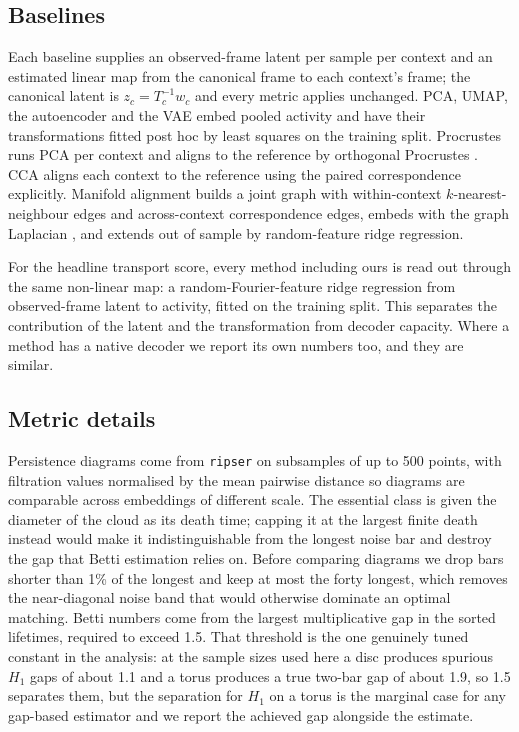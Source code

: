 \subsection{Baselines}

Each baseline supplies an observed-frame latent per sample per context and an
estimated linear map from the canonical frame to each context's frame; the
canonical latent is $z_c = T_c^{-1}w_c$ and every metric applies unchanged. PCA,
UMAP, the autoencoder and the VAE embed pooled activity and have their
transformations fitted post hoc by least squares on the training split.
Procrustes runs PCA per context and aligns to the reference by orthogonal
Procrustes \citep{schonemann1966generalized}. CCA aligns each context to the
reference using the paired correspondence explicitly. Manifold alignment builds a
joint graph with within-context $k$-nearest-neighbour edges and across-context
correspondence edges, embeds with the graph Laplacian \citep{ham2005semisupervised},
and extends out of sample by random-feature ridge regression.

For the headline transport score, every method including ours is read out through
the same non-linear map: a random-Fourier-feature ridge regression
\citep{rahimi2007random} from observed-frame latent to activity, fitted on the
training split. This separates the contribution of the latent and the
transformation from decoder capacity. Where a method has a native decoder we
report its own numbers too, and they are similar.

\subsection{Metric details}

Persistence diagrams come from \texttt{ripser} \citep{tralie2018ripser} on
subsamples of up to 500 points, with filtration values normalised by the mean
pairwise distance so diagrams are comparable across embeddings of different
scale. The essential class is given the diameter of the cloud as its death time;
capping it at the largest finite death instead would make it indistinguishable
from the longest noise bar and destroy the gap that Betti estimation relies on.
Before comparing diagrams we drop bars shorter than 1\% of the longest and keep
at most the forty longest, which removes the near-diagonal noise band that would
otherwise dominate an optimal matching. Betti numbers come from the largest
multiplicative gap in the sorted lifetimes, required to exceed 1.5. That
threshold is the one genuinely tuned constant in the analysis: at the sample sizes
used here a disc produces spurious $H_1$ gaps of about 1.1 and a torus produces a
true two-bar gap of about 1.9, so 1.5 separates them, but the separation for
$H_1$ on a torus is the marginal case for any gap-based estimator and we report
the achieved gap alongside the estimate.

